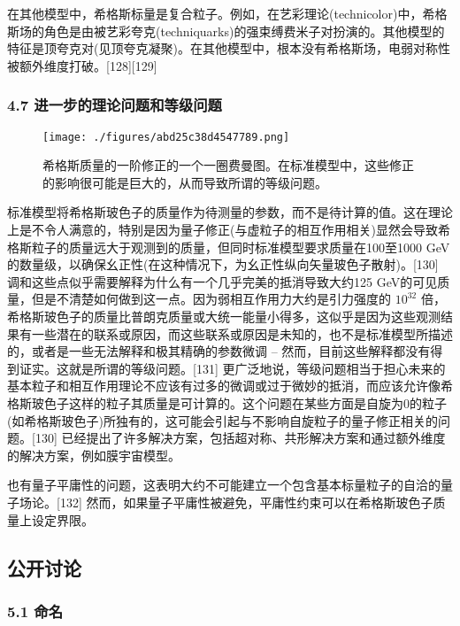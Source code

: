 在其他模型中，希格斯标量是复合粒子。例如，在艺彩理论(technicolor)中，希格斯场的角色是由被艺彩夸克(techniquarks)的强束缚费米子对扮演的。其他模型的特征是顶夸克对(见顶夸克凝聚)。在其他模型中，根本没有希格斯场，电弱对称性被额外维度打破。[128][129]

\subsubsection{4.7 进一步的理论问题和等级问题}

\begin{figure}[ht]
\centering
\texttt{[image: ./figures/abd25c38d4547789.png]}
\caption{希格斯质量的一阶修正的一个一圈费曼图。在标准模型中，这些修正的影响很可能是巨大的，从而导致所谓的等级问题。} \label{fig_Higgs_14}
\end{figure}

标准模型将希格斯玻色子的质量作为待测量的参数，而不是待计算的值。这在理论上是不令人满意的，特别是因为量子修正(与虚粒子的相互作用相关)显然会导致希格斯粒子的质量远大于观测到的质量，但同时标准模型要求质量在100至1000 GeV的数量级，以确保幺正性(在这种情况下，为幺正性纵向矢量玻色子散射)。[130] 调和这些点似乎需要解释为什么有一个几乎完美的抵消导致大约125 GeV的可见质量，但是不清楚如何做到这一点。因为弱相互作用力大约是引力强度的 $10^{32}$ 倍，希格斯玻色子的质量比普朗克质量或大统一能量小得多，这似乎是因为这些观测结果有一些潜在的联系或原因，而这些联系或原因是未知的，也不是标准模型所描述的，或者是一些无法解释和极其精确的参数微调 – 然而，目前这些解释都没有得到证实。这就是所谓的等级问题。[131] 更广泛地说，等级问题相当于担心未来的基本粒子和相互作用理论不应该有过多的微调或过于微妙的抵消，而应该允许像希格斯玻色子这样的粒子其质量是可计算的。这个问题在某些方面是自旋为0的粒子(如希格斯玻色子)所独有的，这可能会引起与不影响自旋粒子的量子修正相关的问题。[130] 已经提出了许多解决方案，包括超对称、共形解决方案和通过额外维度的解决方案，例如膜宇宙模型。

也有量子平庸性的问题，这表明大约不可能建立一个包含基本标量粒子的自洽的量子场论。[132] 然而，如果量子平庸性被避免，平庸性约束可以在希格斯玻色子质量上设定界限。

\subsection{公开讨论}

\subsubsection{5.1 命名}

